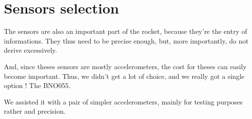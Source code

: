 \section{Sensors selection}
The sensors are also an important part of the rocket, because they're the entry of informations.
They thus need to be precise enough, but, more importantly, do not derive excessively.

And, since theses sensors are mostly accelerometers, the cost for theses can easily become 
important. Thus, we didn't get a lot of choice, and we really got a single option ! The BNO055.

We assisted it with a pair of simpler accelerometers, mainly for testing purposes rather and 
precision.